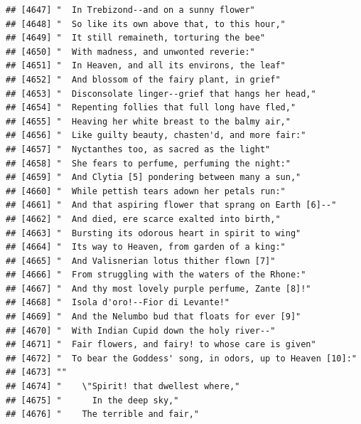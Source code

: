 \documentclass{article}\usepackage[]{graphicx}\usepackage[]{color}
\makeatletter
\newenvironment{kframe}{%
 \def\at@end@of@kframe{}%
 \ifinner\ifhmode%
  \def\at@end@of@kframe{\end{minipage}}%
  \begin{minipage}{\columnwidth}%
 \fi\fi%
 \def\FrameCommand##1{\hskip\@totalleftmargin \hskip-\fboxsep
 \colorbox{shadecolor}{##1}\hskip-\fboxsep
     \hskip-\linewidth \hskip-\@totalleftmargin \hskip\columnwidth}%
 \MakeFramed {\advance\hsize-\width
   \@totalleftmargin\z@ \linewidth\hsize
   \@setminipage}}%
 {\par\unskip\endMakeFramed%
 \at@end@of@kframe}
\newenvironment{knitrout}{}{} %
\makeatother
\begin{document}
\begin{knitrout}
\begin{kframe}
\begin{verbatim}
## [4647] "  In Trebizond--and on a sunny flower"                                       
## [4648] "  So like its own above that, to this hour,"                                 
## [4649] "  It still remaineth, torturing the bee"                                     
## [4650] "  With madness, and unwonted reverie:"                                       
## [4651] "  In Heaven, and all its environs, the leaf"                                 
## [4652] "  And blossom of the fairy plant, in grief"                                  
## [4653] "  Disconsolate linger--grief that hangs her head,"                           
## [4654] "  Repenting follies that full long have fled,"                               
## [4655] "  Heaving her white breast to the balmy air,"                                
## [4656] "  Like guilty beauty, chasten'd, and more fair:"                             
## [4657] "  Nyctanthes too, as sacred as the light"                                    
## [4658] "  She fears to perfume, perfuming the night:"                                
## [4659] "  And Clytia [5] pondering between many a sun,"                              
## [4660] "  While pettish tears adown her petals run:"                                 
## [4661] "  And that aspiring flower that sprang on Earth [6]--"                       
## [4662] "  And died, ere scarce exalted into birth,"                                  
## [4663] "  Bursting its odorous heart in spirit to wing"                              
## [4664] "  Its way to Heaven, from garden of a king:"                                 
## [4665] "  And Valisnerian lotus thither flown [7]"                                   
## [4666] "  From struggling with the waters of the Rhone:"                             
## [4667] "  And thy most lovely purple perfume, Zante [8]!"                            
## [4668] "  Isola d'oro!--Fior di Levante!"                                            
## [4669] "  And the Nelumbo bud that floats for ever [9]"                              
## [4670] "  With Indian Cupid down the holy river--"                                   
## [4671] "  Fair flowers, and fairy! to whose care is given"                           
## [4672] "  To bear the Goddess' song, in odors, up to Heaven [10]:"                   
## [4673] ""                                                                            
## [4674] "    \"Spirit! that dwellest where,"                                          
## [4675] "      In the deep sky,"                                                      
## [4676] "    The terrible and fair,"                                                  

\end{verbatim}
\end{kframe}
\end{knitrout}
\end{document}
